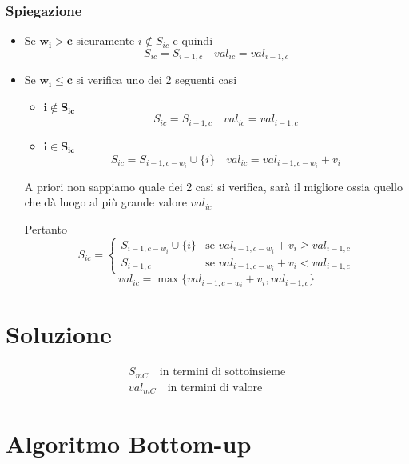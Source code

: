 \subsubsection{Spiegazione}
\begin{itemize}
    \item Se $\mathbf{w_i > c}$ sicuramente $i \not \in S_{ic}$ e quindi
    $$
    S_{ic} = S_{i-1,c} \quad val_{ic} = val_{i-1,c}
    $$

    \item Se $\mathbf{w_i \leq c}$ si verifica uno dei 2 seguenti casi
    \begin{itemize}
        \item $\mathbf{i \not \in S_{ic}}$
        $$ S_{ic} = S_{i-1,c} \quad val_{ic} = val_{i-1,c}$$

        \item $\mathbf{i \in S_{ic}}$
        $$ S_{ic} = S_{i-1, c-w_i} \cup \{i\} \quad val_{ic} = val_{i-1, c-w_i} + v_i $$ 
    \end{itemize}

    A priori non sappiamo quale dei 2 casi si verifica, sarà il migliore ossia quello che dà luogo al più grande valore $val_{ic}$

    Pertanto
    $$
    S_{ic} = 
    \begin{cases}
        S_{i-1, c- w_i} \cup \{i\} & \text{se } val_{i-1, c-w_i} + v_i \geq val_{i-1,c} \\
        S_{i-1,c} & \text{se } val_{i-1, c-w_i} + v_i < val_{i-1,c}
    \end{cases}
    $$
    $$
    val_{ic} = \max\{val_{i-1, c-w_i} + v_i, val_{i-1,c}\}
    $$
\end{itemize}

\section{Soluzione}
{
    \large

    \begin{gather*}
        S_{mC} \quad \text{in termini di sottoinsieme} \\
        val_{mC} \quad \text{in termini di valore}
    \end{gather*}
}

\newpage
\section{Algoritmo Bottom-up}

